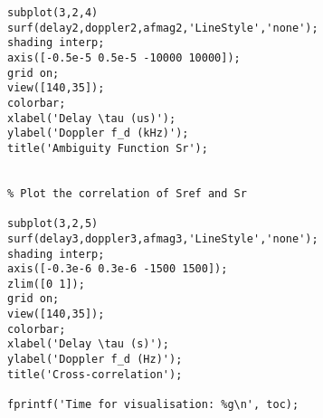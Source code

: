 \begin{verbatim}
subplot(3,2,4)   
surf(delay2,doppler2,afmag2,'LineStyle','none'); 
shading interp;
axis([-0.5e-5 0.5e-5 -10000 10000]); 
grid on; 
view([140,35]); 
colorbar;
xlabel('Delay \tau (us)');
ylabel('Doppler f_d (kHz)');
title('Ambiguity Function Sr');


% Plot the correlation of Sref and Sr

subplot(3,2,5)
surf(delay3,doppler3,afmag3,'LineStyle','none'); 
shading interp;
axis([-0.3e-6 0.3e-6 -1500 1500]); 
zlim([0 1]);
grid on; 
view([140,35]); 
colorbar;
xlabel('Delay \tau (s)');
ylabel('Doppler f_d (Hz)');
title('Cross-correlation');

fprintf('Time for visualisation: %g\n', toc);
\end{verbatim}
